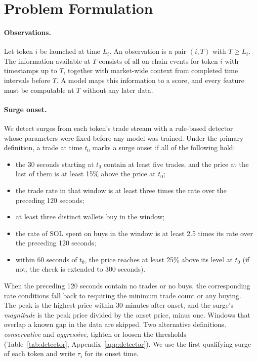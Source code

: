 \section{Problem Formulation}
\label{sec:problem}

\paragraph{Observations.}
Let token $i$ be launched at time $L_i$. An observation is a pair $(i, T)$ with $T \ge L_i$. The information available at $T$ consists of all on-chain events for token $i$ with timestamps up to $T$, together with market-wide context from completed time intervals before $T$. A model maps this information to a score, and every feature must be computable at $T$ without any later data.

\paragraph{Surge onset.}
We detect surges from each token's trade stream with a rule-based detector whose parameters were fixed before any model was trained. Under the primary definition, a trade at time $t_0$ marks a surge onset if all of the following hold:
\begin{itemize}
  \item the 30 seconds starting at $t_0$ contain at least five trades, and the price at the last of them is at least 15\% above the price at $t_0$;
  \item the trade rate in that window is at least three times the rate over the preceding 120 seconds;
  \item at least three distinct wallets buy in the window;
  \item the rate of SOL spent on buys in the window is at least 2.5 times its rate over the preceding 120 seconds;
  \item within 60 seconds of $t_0$, the price reaches at least 25\% above its level at $t_0$ (if not, the check is extended to 300 seconds).
\end{itemize}
When the preceding 120 seconds contain no trades or no buys, the corresponding rate conditions fall back to requiring the minimum trade count or any buying. The peak is the highest price within 30 minutes after onset, and the surge's \emph{magnitude} is the peak price divided by the onset price, minus one. Windows that overlap a known gap in the data are skipped. Two alternative definitions, \emph{conservative} and \emph{aggressive}, tighten or loosen the thresholds (Table~\ref{tab:detector}, Appendix~\ref{app:detector}). We use the first qualifying surge of each token and write $\tau_i$ for its onset time.

